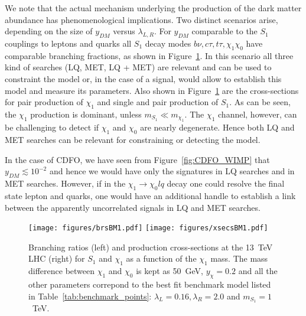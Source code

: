 \documentclass[11pt]{cernrep}
\begin{document}
We note that the actual mechanism underlying the production of the dark matter abundance has phenomenological implications. Two distinct scenarios arise, depending on the size of $y_{DM}$ versus $\lambda_{L,R}$. For $y_{DM}$ comparable to the $S_1$ couplings to leptons and quarks all $S_1$ decay modes $b \nu, c \tau, t \tau, \chi_1 \chi_0$ have comparable branching fractions,
as shown in Figure~\ref{fig:xsecBRs}. In this scenario all three kind of searches (LQ, MET, LQ + MET) are relevant and can be used to constraint the model or, in the case of a signal,  would allow to establish this model and measure its parameters.
Also shown in Figure~\ref{fig:xsecBRs} are the cross-sections for pair production of $\chi_1$ and single and pair production of $S_1$. As can be seen, the $\chi_1$ production is dominant, unless $m_{S_1} \ll m_{\chi_1}$. The $\chi_1$ channel, however, can be challenging to detect if $\chi_1$ and $\chi_0$ are nearly degenerate. Hence both LQ and MET searches can be relevant for constraining or detecting the model.


In the case of CDFO, we have seen from Figure~\ref{fig:CDFO_WIMP} that $y_{DM} \lesssim 10^{-2}$ and hence we would have only the signatures in LQ searches and in MET searches. However, if in the $\chi_1 \to \chi_0 l q$ decay one could resolve the final state lepton and quarks, one would have an additional handle to establish a link between the apparently uncorrelated signals in LQ and MET searches.

\begin{figure}[!h]
	\centering
	\texttt{[image: figures/brsBM1.pdf]}
	\texttt{[image: figures/xsecsBM1.pdf]}
	\caption{Branching ratios (left) and production cross-sections at the 13~TeV  LHC (right) for $S_1$ and $\chi_1$ as a function of the $\chi_1$ mass. The mass difference between $\chi_1$ and $\chi_0$ is kept as 50~GeV, $y_{\chi} = 0.2$ and all the other parameters correpond to the best fit benchmark model listed in Table~\ref{tab:benchmark_points}: $\lambda_L = 0.16, \lambda_R = 2.0$ and $m_{S_1} = 1$~TeV.
		\label{fig:xsecBRs}
	}
\end{figure}
\end{document}
